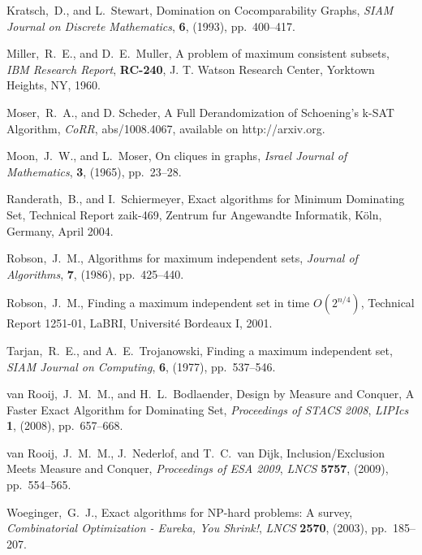 \documentclass[a4paper,10pt]{article}
\theoremstyle{plain}
\theoremstyle{definition}
\theoremstyle{remark}
\begin{document}
\begin{thebibliography}{99}
Kratsch,~D., and L.~Stewart,
Domination on Cocomparability Graphs,
{\em SIAM Journal on Discrete Mathematics\/},
{\bf 6}, (1993), pp.~400--417.

 Miller,~R.~E., and D.~E.~Muller,
A problem of maximum consistent subsets,
{\em IBM Research Report},
{\bf RC-240}, J. T. Watson Research Center, Yorktown Heights, NY, 1960.

 Moser,~R.~A., and D. Scheder,
A Full Derandomization of Schoening's k-SAT Algorithm,
{\em CoRR},
{abs/1008.4067},
available on http://arxiv.org.

Moon,~J.~W., and L.~Moser,
On cliques in graphs,
{\em Israel Journal of Mathematics\/},
{\bf 3}, (1965), pp.~23--28.

Randerath,~B., and I.~Schiermeyer,
Exact algorithms for Minimum Dominating Set,
Technical Report zaik-469, Zentrum fur Angewandte Informatik,
K\"oln, Germany, April 2004.

Robson,~J.~M.,
Algorithms for maximum independent sets,
{\em Journal of Algorithms}, {\bf 7}, (1986), pp.~425--440.

Robson,~J.~M.,
Finding a maximum independent set in time $O(2^{n/4})$,
Technical Report 1251-01, LaBRI, Universit\'e Bordeaux I, 2001.



Tarjan,~R.~E., and A.~E.~Trojanowski,
Finding a maximum independent set,
{\em SIAM Journal on Computing\/},
{\bf 6}, (1977), pp.~537--546.

van Rooij,~J.~M.~M., and H.~L.~Bodlaender,
Design by Measure and Conquer, A Faster Exact Algorithm for Dominating Set,
{\em Proceedings of STACS 2008\/}, {\em LIPIcs\/}
{\bf 1}, (2008), pp.~657--668.

van Rooij,~J.~M.~M., J.~Nederlof, and T.~C.~van Dijk,
Inclusion/Exclusion Meets Measure and Conquer,
{\em Proceedings of ESA 2009\/}, {\em LNCS\/}
{\bf 5757}, (2009), pp.~554--565.


Woeginger,~G.~J.,
Exact algorithms for NP-hard problems: A survey,
{\em Combinatorial Optimization - Eureka, You Shrink!\/}, {\em LNCS\/}
{\bf 2570}, (2003), pp.~185--207.



\end{thebibliography}
\end{document}
